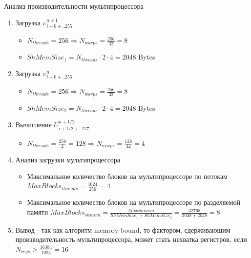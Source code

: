 \begin{frame}{Анализ производительности мультипроцессора\cite{kirk:cuda}}
\begin{enumerate}
  \item Загрузка $\upsilon^{n+1}_{i+0+..255}$
  \begin{itemize}
        \item $N_{threads}=256 \Rightarrow N_{warps}=\frac{256}{32}=8$ 
        \item $ShMemSize_1 = N_{threads}\cdot 2 \cdot 4 = 2048$ Bytes
  \end {itemize}
  \item Загрузка $\upsilon^{n}_{i+0+..255}$
  \begin{itemize}
        \item $N_{threads}=256 \Rightarrow N_{warps}=\frac{256}{32}=8$
        \item $ShMemSize_2 = N_{threads}\cdot 2 \cdot 4 = 2048$ Bytes
  \end {itemize}
  \item Вычисление $U^{n+1/2}_{i+1/2+..127}$
  \begin{itemize}
        \item $N_{threads}=\frac{256}{2}=128 \Rightarrow N_{warps}=\frac{128}{32}=4$
  \end {itemize}
  \item Анализ загрузки мультипроцессора
  \begin{itemize}
   \item Максимальное количество блоков на мультипроцессоре по потокам $MaxBlocks_{threads}=\frac{1024}{256}=4$
   \item Максимальное количество блоков на мультипроцессоре по разделяемой памяти $MaxBlocks_{shmem}=\frac{MaxShmem}{ShMemSize_1 + ShMemSize_2}=\frac{32768}{2048 + 2048}=8$
  \end {itemize}
  \item Вывод - так как алгоритм memory-bound, то фактором, сдерживающим производительность мультипроцессора, может стать нехватка регистров, если $N_{regs}\gtrdot \frac{16384}{1024}=16$
\end{enumerate}
\end{frame}

